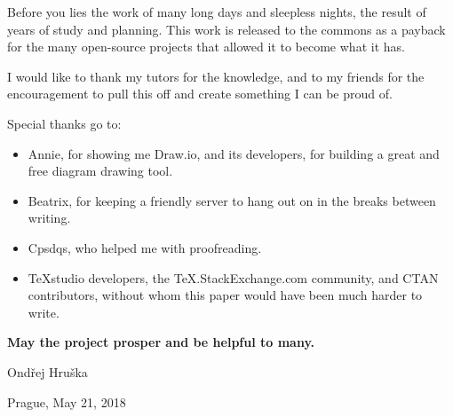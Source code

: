 \begin{thanks}

Before you lies the work of many long days and sleepless nights, the result of years of study and planning. This work is released to the commons as a payback for the many open-source projects that allowed it to become what it has.

I would like to thank my tutors for the knowledge, and to my friends for the encouragement to pull this off and create something I can be proud of. 

\vspace{10pt}
\noindent
Special thanks go to:

\vspace{-10pt}
\begin{itemize}
\item Annie, for showing me Draw.io, and its developers, for building a great and free diagram drawing tool.
\item Beatrix, for keeping a friendly server to hang out on in the breaks between writing.
\item Cpsdqs, who helped me with proofreading.
\item TeXstudio developers, the TeX.StackExchange.com community, and CTAN contributors, without whom this paper would have been much harder to write.
\end{itemize}

\noindent
\textbf{May the project prosper and be helpful to many.}

\vspace{25pt}
\noindent
Ondřej Hruška

\noindent
Prague, May 21, 2018

\end{thanks}
